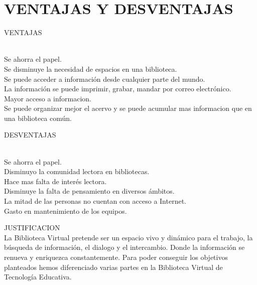 \section{VENTAJAS Y DESVENTAJAS} 

\begin{enumerate}[7.]

	\begin{center}
	\item VENTAJAS
	\end{center}
  \\ Se ahorra el papel. 
  \\ Se disminuye la  necesidad de espacios en una biblioteca.  
  \\ Se puede acceder a información desde cualquier parte del mundo.  
  \\ La información se puede imprimir, grabar, mandar por correo electrónico. 
  \\ Mayor acceso a informacion. 
  \\ Se puede organizar mejor el acervo  y se puede acumular mas  informacion que en una biblioteca común.
  \\
	\begin{center}
	\item DESVENTAJAS
	\end{center}
	\\ Se ahorra el papel. 
  \\ Disminuyo la comunidad lectora en bibliotecas. 
  \\ Hace mas falta de interés lectora. 
  \\ Disminuye la falta de pensamiento en diversos ámbitos.  
  \\ La mitad de las personas no cuentan con acceso a Internet. 
  \\ Gasto en mantenimiento de los equipos. 
	\\
    \item JUSTIFICACION
\\ La Biblioteca Virtual  pretende ser un espacio vivo y dinámico para el trabajo, la búsqueda de información, el dialogo y el intercambio. Donde la información se renueva y enriquezca constantemente. Para poder conseguir los objetivos planteados hemos diferenciado varias partes en la Biblioteca Virtual de Tecnología Educativa.

\end{enumerate} 
